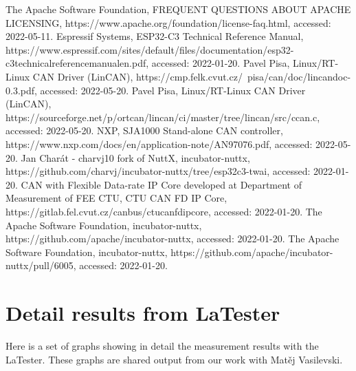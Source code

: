 \documentclass{ctuthesis}
\begin{document}
\begin{thebibliography}{1}
 The Apache Software Foundation, FREQUENT QUESTIONS ABOUT APACHE LICENSING, https://www.apache.org/foundation/license-faq.html, accessed: 2022-05-11.
 Espressif Systems, ESP32-C3 Technical Reference Manual,
https://www.espressif.com/sites/default/files/documentation/esp32-c3\text{-}technical\text{-}reference\text{-}manual\text{-}en.pdf, accessed: 2022-01-20.
 Pavel Pisa, Linux/RT-Linux CAN Driver (LinCAN), https://cmp.felk.cvut.cz/~pisa/can/doc/lincandoc-0.3.pdf, accessed: 2022-05-20.
 Pavel Pisa, Linux/RT-Linux CAN Driver (LinCAN), https://sourceforge.net/p/ortcan/lincan/ci/master/tree/lincan/src/c\text{-}can.c, accessed: 2022-05-20.
 NXP, SJA1000 Stand-alone CAN controller, https://www.nxp.com/docs/en/application-note/AN97076.pdf, accessed: 2022-05-20.
 Jan Charát - charvj10 fork of NuttX, incubator-nuttx, https://github.com/charvj/incubator-nuttx/tree/esp32c3-twai, accessed: 2022-01-20.
 CAN with Flexible Data-rate IP Core developed at Department of Measurement of FEE CTU, CTU CAN FD IP Core, https://gitlab.fel.cvut.cz/canbus/ctucanfd\text{-}ip\text{-}core, accessed: 2022-01-20.
 The Apache Software Foundation, incubator-nuttx, https://github.com/apache/incubator-nuttx, accessed: 2022-01-20.
 The Apache Software Foundation, incubator-nuttx, https://github.com/apache/incubator-nuttx/pull/6005, accessed: 2022-01-20.

\end{thebibliography}

\appendix
\chapter{Detail results from LaTester}
 Here is a set of graphs showing in detail the measurement results with the LaTester. These graphs are shared output from our work with Matěj Vasilevski.
  
\end{document}
